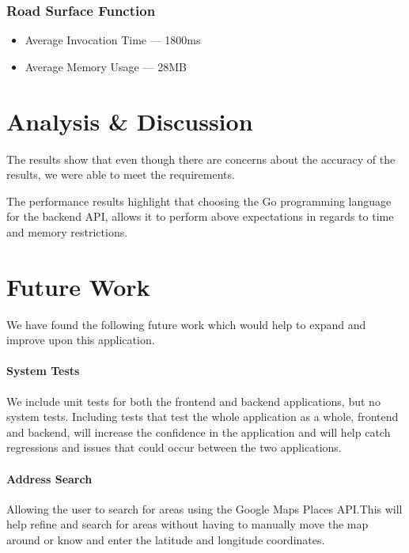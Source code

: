 \documentclass[a4paper,11pt]{article}
\begin{document}
\subsubsection{Road Surface Function}

\begin{itemize}
  \item Average Invocation Time --- 1800ms
  \item Average Memory Usage --- 28MB
\end{itemize}

\section{Analysis \& Discussion}


The results show that even though there are concerns about the accuracy of the
results, we were able to meet the requirements.

The performance results highlight that choosing the Go programming language
for the backend API, allows it to perform above expectations in regards to
time and memory restrictions.


\section{Future Work}

We have found the following future work which would help to expand and improve
upon this application.

\paragraph{System Tests} We include unit tests for both the frontend and backend
applications, but no system tests. Including tests that test the whole
application as a whole, frontend and backend, will increase the confidence in
the application and will help catch regressions and issues that could occur
between the two applications.

\paragraph{Address Search} Allowing the user to search for areas using the
Google Maps Places API.\@ This will help refine and search for areas without
having to manually move the map around or know and enter the latitude and
longitude coordinates.
\end{document}
